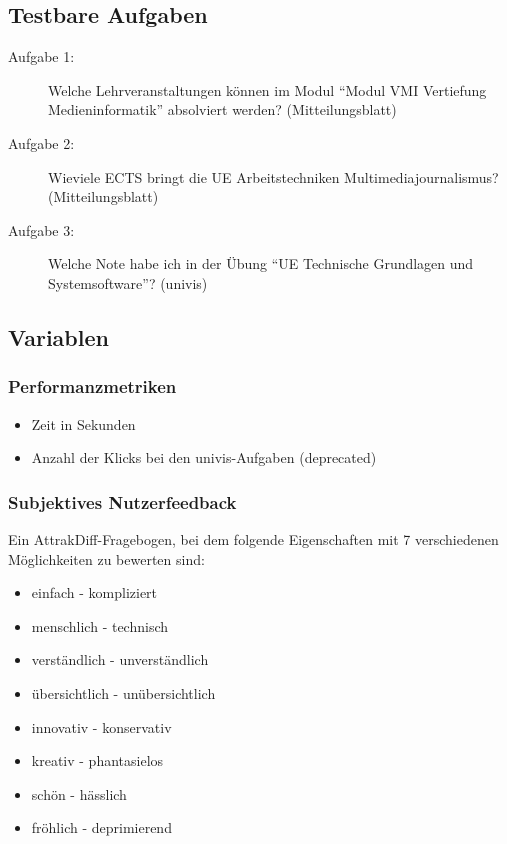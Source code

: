 \documentclass[a4paper,10pt]{scrartcl}
\begin{document}
\subsection{Testbare Aufgaben}

\begin{description}
 \item[Aufgabe 1:] Welche Lehrveranstaltungen können im Modul ``Modul VMI Vertiefung Medieninformatik'' absolviert werden? (Mitteilungsblatt)
 \item[Aufgabe 2:] Wieviele ECTS bringt die UE Arbeitstechniken Multimediajournalismus? (Mitteilungsblatt)
 \item[Aufgabe 3:] Welche Note habe ich in der Übung ``UE Technische Grundlagen und Systemsoftware''? (univis)
\end{description}

\subsection{Variablen}

\subsubsection{Performanzmetriken}

\begin{itemize}
 \item Zeit in Sekunden
 \item Anzahl der Klicks bei den univis-Aufgaben (deprecated)
\end{itemize}

\subsubsection{Subjektives Nutzerfeedback}

Ein AttrakDiff-Fragebogen, bei dem folgende Eigenschaften mit 7 verschiedenen Möglichkeiten zu bewerten sind:

\begin{itemize}
\item einfach - kompliziert 
\item menschlich - technisch
\item verständlich - unverständlich
\item übersichtlich - unübersichtlich 
\item innovativ - konservativ
\item kreativ - phantasielos
\item schön - hässlich
\item fröhlich - deprimierend 
\end{itemize}
\end{document}
